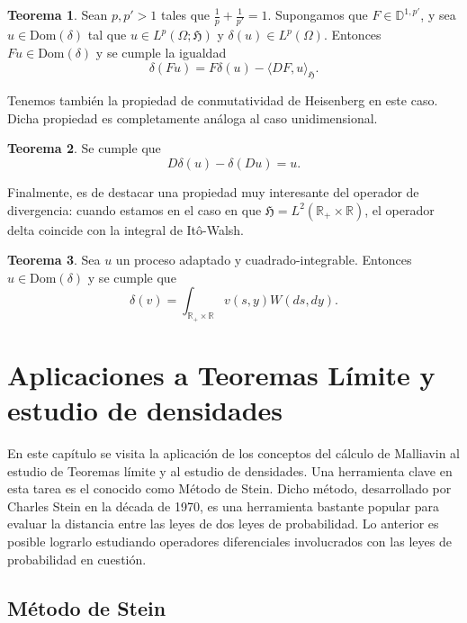 \documentclass[letterpaper,twoside,12pt]{book}
\newcommand{\R}{\mathbb{R}}
\newcommand{\D}{\mathbb{D}}
\newcommand{\1}{\mathds{1}}
\theoremstyle{definition}
\theoremstyle{definition}
\newtheorem{teo}{Teorema}
\theoremstyle{remark}
\theoremstyle{definition}
\theoremstyle{definition}
\theoremstyle{definition}
\theoremstyle{definition}
\theoremstyle{definition}
\begin{document}
\begin{teo}\label{factordeltafuera}
 Sean $p,p'>1$ tales que $\frac{1}{p}+\frac{1}{p'}=1$. Supongamos que $F\in \D^{1,p'}$, y sea $u \in \text{Dom}(\delta)$ tal que $u\in L^{p}(\Omega;\mathfrak{H})$ y $\delta(u)\in L^{p}(\Omega)$. Entonces $Fu\in \text{Dom}(\delta)$ y se cumple la igualdad 
 \begin{equation}\label{eqfactordeltafuera}
   \delta (Fu)=F\delta(u)-\langle DF,u\rangle_{\mathfrak{H}}.
\end{equation}
 
 \end{teo}

 Tenemos también la propiedad de conmutatividad de Heisenberg en este caso. Dicha propiedad es completamente análoga al caso unidimensional.

\begin{teo} 
Se cumple que 
\[
D\delta(u)-\delta(Du)=u.
\]
 \end{teo}

Finalmente, es de destacar una propiedad muy interesante del operador de divergencia: cuando estamos en el caso en que $\mathfrak{H}=L^2(\R_+\times\R)$, el operador delta coincide con la integral de Itô-Walsh.

\begin{teo} 
 Sea $u$ un proceso adaptado y cuadrado-integrable. Entonces $u\in \text{Dom}(\delta)$ y se cumple que 
 \[
 \delta(v)=\int_{\R_+\times \R}^{}v(s,y)W(ds,dy).
 \]
 \end{teo}
 
 \chapter{Aplicaciones a Teoremas Límite y estudio de densidades}
En este capítulo se visita la aplicación de los conceptos del cálculo de Malliavin al estudio de Teoremas límite y al estudio de densidades. 
Una herramienta clave en esta tarea es el conocido como Método de Stein. 
Dicho método, desarrollado por Charles Stein en la década de 1970, es una herramienta bastante popular para evaluar la distancia entre las leyes de dos leyes de probabilidad. Lo anterior es posible lograrlo estudiando operadores diferenciales involucrados con las leyes de probabilidad en cuestión.

\section{Método de Stein}
\end{document}
